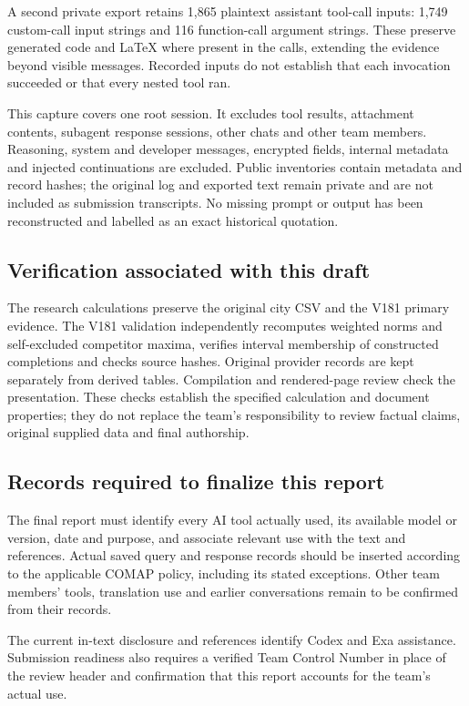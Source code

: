 A second private export retains 1,865 plaintext assistant tool-call inputs:
1,749 custom-call input strings and 116 function-call argument strings.
These preserve generated code and LaTeX where present in the calls, extending
the evidence beyond visible messages. Recorded inputs do not establish that
each invocation succeeded or that every nested tool ran.

This capture covers one root session. It excludes tool results, attachment
contents, subagent response sessions, other chats and other team members.
Reasoning, system and developer messages, encrypted fields, internal metadata
and injected continuations are excluded. Public inventories contain metadata
and record hashes; the original log and exported text remain private and are
not included as submission transcripts. No missing prompt or output has been
reconstructed and labelled as an exact historical quotation.

\subsection*{Verification associated with this draft}
The research calculations preserve the original city CSV and the V181 primary
evidence. The V181 validation independently recomputes weighted norms and
self-excluded competitor maxima, verifies interval membership of constructed
completions and checks source hashes. Original provider records are kept
separately from derived tables. Compilation and rendered-page review check the
presentation. These checks establish the specified calculation and document
properties; they do not replace the team's responsibility to review factual
claims, original supplied data and final authorship.

\subsection*{Records required to finalize this report}
The final report must identify every AI tool actually used, its available
model or version, date and purpose, and associate relevant use with the text
and references. Actual saved query and response records should be inserted
according to the applicable COMAP policy, including its stated exceptions.
Other team members' tools, translation use and earlier conversations remain
to be confirmed from their records.

The current in-text disclosure and references identify Codex and Exa
assistance. Submission readiness also requires a verified Team Control Number
in place of the review header and confirmation that this report accounts for
the team's actual use.
